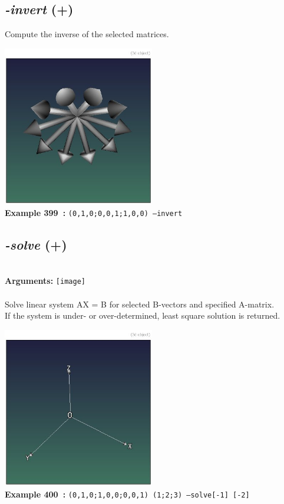 \documentclass[a4paper,11pt,twoside]{book}
\begin{document}
\subsection{\emph{-invert} (+)}\vspace*{-0.5em}
Compute the inverse of the selected matrices.
\begin{center}\includegraphics[keepaspectratio=true,height=7cm,width=\textwidth]{img/gmic_def399.jpg}\\
{\footnotesize \textbf{Example 399~:} \texttt{(0,1,0;0,0,1;1,0,0) --invert}}
\end{center}

\subsection{\emph{-solve} (+)}\vspace*{-0.5em}
~\\\textbf{Arguments: } 
{\small \texttt{[image]}}\\~\\
Solve linear system AX = B for selected B-vectors and specified A-matrix.
~\\If the system is under- or over-determined, least square solution is returned.
\begin{center}\includegraphics[keepaspectratio=true,height=7cm,width=\textwidth]{img/gmic_def400.jpg}\\
{\footnotesize \textbf{Example 400~:} \texttt{(0,1,0;1,0,0;0,0,1) (1;2;3) --solve[-1] [-2]}}
\end{center}
\end{document}
